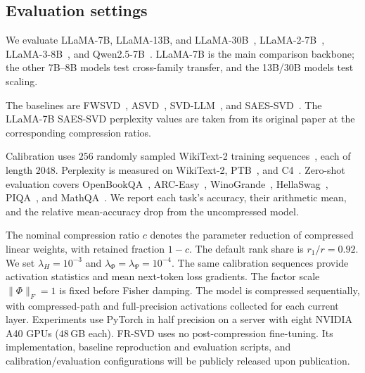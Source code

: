 \subsection{Evaluation settings}
We evaluate LLaMA-7B, LLaMA-13B, and LLaMA-30B~\citep{touvron2023llama}, LLaMA-2-7B~\citep{touvron2023llama2}, LLaMA-3-8B~\citep{dubey2024llama3}, and Qwen2.5-7B~\citep{yang2024qwen25}. LLaMA-7B is the main comparison backbone; the other 7B--8B models test cross-family transfer, and the 13B/30B models test scaling.

The baselines are FWSVD~\citep{hsu2022fwsvd}, ASVD~\citep{yuan2023asvd}, SVD-LLM~\citep{wang2025svdllm}, and SAES-SVD~\citep{hu2026saessvd}. The LLaMA-7B SAES-SVD perplexity values are taken from its original paper at the corresponding compression ratios.

Calibration uses $256$ randomly sampled WikiText-2 training sequences~\citep{merity2017wikitext2}, each of length $2048$. Perplexity is measured on WikiText-2, PTB~\citep{marcus1993ptb}, and C4~\citep{raffel2020c4}. Zero-shot evaluation covers OpenBookQA~\citep{mihaylov2018openbook}, ARC-Easy~\citep{clark2018think}, WinoGrande~\citep{sakaguchi2021winogrande}, HellaSwag~\citep{zellers2019hellaswag}, PIQA~\citep{bisk2020piqa}, and MathQA~\citep{amini2019mathqa}. We report each task's accuracy, their arithmetic mean, and the relative mean-accuracy drop from the uncompressed model.

The nominal compression ratio $c$ denotes the parameter reduction of compressed linear weights, with retained fraction $1-c$. The default rank share is $r_1/r=0.92$. We set $\lambda_H=10^{-3}$ and $\lambda_\Phi=\lambda_\Psi=10^{-4}$. The same calibration sequences provide activation statistics and mean next-token loss gradients. The factor scale $\|\Phi\|_F=1$ is fixed before Fisher damping. The model is compressed sequentially, with compressed-path and full-precision activations collected for each current layer. Experiments use PyTorch in half precision on a server with eight NVIDIA A40 GPUs ($48$\,GB each). FR-SVD uses no post-compression fine-tuning. Its implementation, baseline reproduction and evaluation scripts, and calibration/evaluation configurations will be publicly released upon publication.

